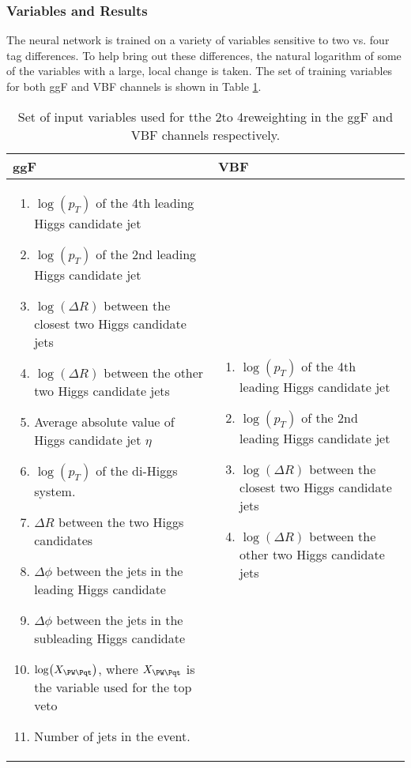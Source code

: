 \subsubsection{Variables and Results}
The neural network is trained on a variety of variables sensitive to two vs.
four tag differences. To help bring out these differences, the natural logarithm 
of some of the variables with a large, local change is taken. The 
set of training variables for both ggF and VBF channels is shown in Table \ref{tbl:rw-vars}. 
\begin{table}[htbp]
	\centering
	\caption{\label{tbl:rw-vars} Set of input variables used for tthe 2\Pqb to 4\Pqb reweighting in the 
	ggF and VBF channels respectively.}
	\begin{tabular}{|p{7cm}|p{7cm}|}
	\hline
	{\bfseries ggF} & {\bfseries VBF} \\
	\hline
	\begin{enumerate}
		\item $\log(p_T)$ of the 4th leading Higgs candidate jet
		\item $\log(p_T)$ of the 2nd leading Higgs candidate jet
		\item $\log(\Delta R)$ between the closest two Higgs candidate jets
		\item $\log(\Delta R)$ between the other two Higgs candidate jets
		\item Average absolute value of Higgs candidate jet $\eta$
		\item $\log(p_T)$ of the di-Higgs system.
		\item $\Delta R$ between the two Higgs candidates
		\item $\Delta \phi$ between the jets in the leading Higgs candidate
		\item $\Delta \phi$ between the jets in the subleading Higgs candidate
		\item $\log(X_{\PW\Pqt})$, where $X_{\PW\Pqt}$ is the variable used for the top veto
		\item Number of jets in the event.
	\end{enumerate}
	&
	\begin{enumerate}
		\item $\log(p_T)$ of the 4th leading Higgs candidate jet
		\item $\log(p_T)$ of the 2nd leading Higgs candidate jet
		\item $\log(\Delta R)$ between the closest two Higgs candidate jets
		\item $\log(\Delta R)$ between the other two Higgs candidate jets

\end{enumerate}
\end{tabular}
\end{table}
